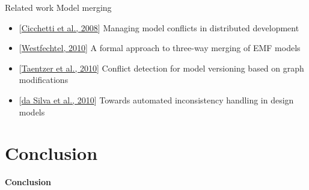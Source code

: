 \documentclass[dvips,slidetop,mathserif,brown]{beamer}
\begin{document}
\begin{frame}{Related work}
  Model merging
  \begin{itemize}
    \item {\textcolor{lily}{[\href{http://dx.doi.org/10.1007/978-3-540-87875-9\_23}{Cicchetti et al., 2008}]}} Managing model conflicts in distributed development
    \item {\textcolor{lily}{[\href{http://dx.doi.org/10.1145/1826147.1826155}{Westfechtel, 2010}]}} A formal approach to three-way merging of EMF models
    \item {\textcolor{lily}{[\href{http://dx.doi.org/10.1007/978-3-642-15928-2\_12}{Taentzer et al., 2010}]}} Conflict detection for model versioning based on graph modifications
    \item {\textcolor{lily}{[\href{http://dx.doi.org/10.1007/978-3-642-13094-6\_28}{da Silva et al., 2010}]}} Towards automated inconsistency handling in design models
  \end{itemize}
\end{frame}




\section{Conclusion}

\begin{frame}{}
  \begin{center}
    \begin{Huge}
      \textbf{Conclusion}
    \end{Huge}
  \end{center}
\end{frame}
\end{document}
